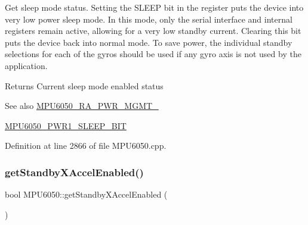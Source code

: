 Get sleep mode status. Setting the S\+L\+E\+EP bit in the register puts the device into very low power sleep mode. In this mode, only the serial interface and internal registers remain active, allowing for a very low standby current. Clearing this bit puts the device back into normal mode. To save power, the individual standby selections for each of the gyros should be used if any gyro axis is not used by the application. \begin{DoxyReturn}{Returns}
Current sleep mode enabled status 
\end{DoxyReturn}
\begin{DoxySeeAlso}{See also}
\mbox{\hyperlink{MPU6050_8h_ac6c83146165a2307ac7155d4fa566df4}{M\+P\+U6050\+\_\+\+R\+A\+\_\+\+P\+W\+R\+\_\+\+M\+G\+M\+T\+\_}} 

\mbox{\hyperlink{MPU6050_8h_a303276044c71a042bb43d24a888104d9}{M\+P\+U6050\+\_\+\+P\+W\+R1\+\_\+\+S\+L\+E\+E\+P\+\_\+\+B\+IT}} 
\end{DoxySeeAlso}


Definition at line 2866 of file M\+P\+U6050.\+cpp.


\begin{DoxyCode}{0}

\end{DoxyCode}
\mbox{\label{classMPU6050_a99261a04739fdb7a9a1c5b67ce3e710e}} 
\subsubsection{\texorpdfstring{getStandbyXAccelEnabled()}{getStandbyXAccelEnabled()}}
{\footnotesize\ttfamily bool M\+P\+U6050\+::get\+Standby\+X\+Accel\+Enabled (\begin{DoxyParamCaption}{ }\end{DoxyParamCaption})}

